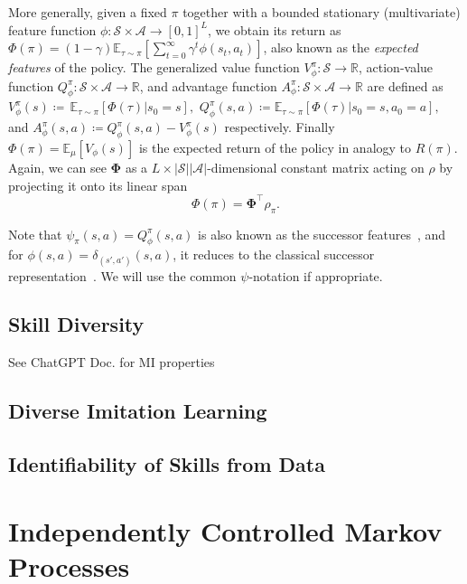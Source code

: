 \documentclass{article}
\theoremstyle{plain}
\theoremstyle{definition}
\theoremstyle{remark}
\newcommand{\sS}{\mathcal{S}}
\newcommand{\sA}{\mathcal{A}}
\begin{document}
More generally, given a fixed $\pi$ together with a bounded stationary (multivariate) feature function $\phi: \sS\times\sA\to[0,1]^L$, we obtain its return as $\Phi(\pi) = (1-\gamma)\mathbb{E}_{\tau\sim\pi}[\sum_{t=0}^{\infty} \gamma^t \phi(s_t, a_t)]$, also known as the \emph{expected features} of the policy. The generalized value function $V_\phi^\pi\colon \sS \to \mathbb{R}$, action-value function $Q_\phi^\pi\colon \sS\times\sA \to \mathbb{R}$, and advantage function $A_\phi^\pi\colon \sS \times \sA \to \mathbb{R}$ are defined as
$V_\phi^\pi(s) \coloneqq \,\mathbb{E}_{\tau\sim\pi} [ \Phi(\tau) |  s_0 = s ],$
$Q_\phi^\pi(s, a) \coloneqq \mathbb{E}_{\tau\sim\pi} [ \Phi(\tau) | s_0 = s, a_0 = a ],$
and
$A_\phi^\pi(s,a) \coloneqq Q_\phi^\pi(s, a) - V_\phi^\pi(s)$ respectively.
Finally $\Phi(\pi) = \mathbb{E}_\mu[V_\phi(s)]$ is the expected return of the policy in analogy to $R(\pi)$. Again, we can see $\boldsymbol{\Phi}$ as a $L\times|\sS||\sA|$-dimensional constant matrix acting on $\rho$ by projecting it onto its linear span
$$
    \Phi(\pi) = \boldsymbol{\Phi}^\top \rho_\pi.
$$

Note that $\psi_\pi(s,a) = Q_\phi^\pi(s,a)$ is also known as the successor features~\citep{barreto2017successor}, and for $\phi(s,a) = \delta_{(s',a')}(s,a)$, it reduces to the classical successor representation~\citep{dayan1993improving}. We will use the common $\psi$-notation if appropriate. 


\subsection{Skill Diversity}
See ChatGPT Doc. for MI properties

\subsection{Diverse Imitation Learning}

\subsection{Identifiability of Skills from Data}

\section{Independently Controlled Markov Processes}
\end{document}

